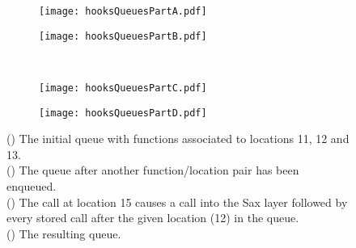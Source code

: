 \documentclass[12pt]{report}
\begin{document}
\begin{figure}
\caption{Representation of the hooks module}
\label{hooksQueues}
\begin{center}
\begin{subfigure}[t]{.4\linewidth}
	\caption{}
	\label{hooksQueuesA}
	\texttt{[image: hooksQueuesPartA.pdf]}
\end{subfigure}
\begin{subfigure}[t]{.4\linewidth}
	\caption{}
	\label{hooksQueuesB}
	\texttt{[image: hooksQueuesPartB.pdf]}
\end{subfigure} \\
\vspace{4mm}
\begin{subfigure}[t]{.4\linewidth}
	\caption{}
	\label{hooksQueuesC}
	\texttt{[image: hooksQueuesPartC.pdf]}
\end{subfigure}
\begin{subfigure}[t]{.4\linewidth}
	\caption{}
	\label{hooksQueuesD}
	\texttt{[image: hooksQueuesPartD.pdf]}
\end{subfigure}
\end{center}
\small{() The initial queue with functions associated to locations 11, 12 and 13. \\() The queue after another function/location pair has been enqueued. \\ () The call at location 15 causes a call into the Sax layer followed by every stored call after the given location (12) in the queue. \\ () The resulting queue. }
\end{figure}
\end{document}
